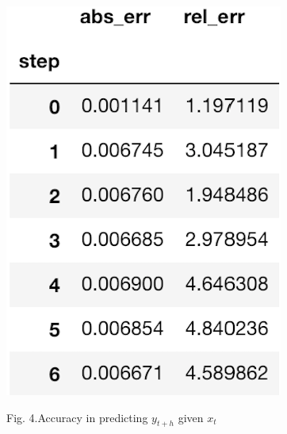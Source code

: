 \documentclass{article}%
\begin{document}
\begin{figure}[h!]
  \centering
  \includegraphics[scale=0.55]{err_step.png}      
\begin{center}
\begin{small}
Fig. 4.Accuracy in predicting $y_{t+h}$ given $x_t$
\end{small}
\end{center}
  \label{err_step}
\end{figure}
\end{document}
